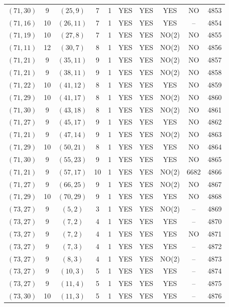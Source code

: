 \begin{longtable}{|c|c|c|c|c|c|c|c|c|c|}
$(71, 30)$ & 9 & $(25, 9)$ & 7 & 1 & YES & YES & YES & NO & 4853\\
$(71, 16)$ & 10 & $(26, 11)$ & 7 & 1 & YES & YES & YES & -- & 4854\\
$(71, 19)$ & 10 & $(27, 8)$ & 7 & 1 & YES & YES & NO(2) & NO & 4855\\
$(71, 11)$ & 12 & $(30, 7)$ & 8 & 1 & YES & YES & NO(2) & NO & 4856\\
$(71, 21)$ & 9 & $(35, 11)$ & 9 & 1 & YES & YES & NO(2) & NO & 4857\\
$(71, 21)$ & 9 & $(38, 11)$ & 9 & 1 & YES & YES & NO(2) & NO & 4858\\
$(71, 22)$ & 10 & $(41, 12)$ & 8 & 1 & YES & YES & YES & NO & 4859\\
$(71, 29)$ & 10 & $(41, 17)$ & 8 & 1 & YES & YES & NO(2) & NO & 4860\\
$(71, 30)$ & 9 & $(43, 18)$ & 8 & 1 & YES & YES & NO(2) & NO & 4861\\
$(71, 27)$ & 9 & $(45, 17)$ & 9 & 1 & YES & YES & YES & NO & 4862\\
$(71, 21)$ & 9 & $(47, 14)$ & 9 & 1 & YES & YES & NO(2) & NO & 4863\\
$(71, 29)$ & 10 & $(50, 21)$ & 8 & 1 & YES & YES & YES & NO & 4864\\
$(71, 30)$ & 9 & $(55, 23)$ & 9 & 1 & YES & YES & YES & NO & 4865\\
$(71, 21)$ & 9 & $(57, 17)$ & 10 & 1 & YES & YES & NO(2) & 6682 & 4866\\
$(71, 27)$ & 9 & $(66, 25)$ & 9 & 1 & YES & YES & NO(2) & NO & 4867\\
$(71, 29)$ & 10 & $(70, 29)$ & 9 & 1 & YES & YES & YES & NO & 4868\\
$(73, 27)$ & 9 & $(5, 2)$ & 3 & 1 & YES & YES & NO(2) & -- & 4869\\
$(73, 27)$ & 9 & $(7, 2)$ & 4 & 1 & YES & YES & YES & -- & 4870\\
$(73, 27)$ & 9 & $(7, 2)$ & 4 & 1 & YES & YES & YES & NO & 4871\\
$(73, 27)$ & 9 & $(7, 3)$ & 4 & 1 & YES & YES & YES & -- & 4872\\
$(73, 27)$ & 9 & $(8, 3)$ & 4 & 1 & YES & YES & NO(2) & -- & 4873\\
$(73, 27)$ & 9 & $(10, 3)$ & 5 & 1 & YES & YES & YES & -- & 4874\\
$(73, 27)$ & 9 & $(11, 4)$ & 5 & 1 & YES & YES & YES & -- & 4875\\
$(73, 30)$ & 10 & $(11, 3)$ & 5 & 1 & YES & YES & YES & -- & 4876\\

\end{longtable}
